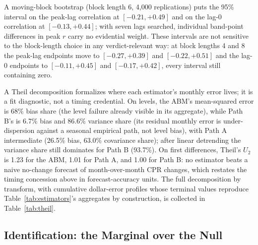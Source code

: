 \documentclass[12pt]{article}
\begin{document}
A moving-block bootstrap (block length 6, 4,000 replications) puts the 95\% interval on the peak-lag correlation at $[-0.21, +0.49]$ and on the lag-0 correlation at $[-0.13, +0.44]$; with seven lags searched, individual band-point differences in peak $r$ carry no evidential weight. These intervals are not sensitive to the block-length choice in any verdict-relevant way: at block lengths 4 and 8 the peak-lag endpoints move to $[-0.27, +0.39]$ and $[-0.22, +0.51]$ and the lag-0 endpoints to $[-0.11, +0.45]$ and $[-0.17, +0.42]$, every interval still containing zero.

A Theil decomposition formalizes where each estimator's monthly error lives; it is a fit diagnostic, not a timing credential. On levels, the ABM's mean-squared error is 68\% bias share (the level failure already visible in its aggregate), while Path B's is 6.7\% bias and 86.6\% variance share (its residual monthly error is under-dispersion against a seasonal empirical path, not level bias), with Path A intermediate (26.5\% bias, 63.0\% covariance share); after linear detrending the variance share still dominates for Path B (93.7\%). On first differences, Theil's $U_2$ is 1.23 for the ABM, 1.01 for Path A, and 1.00 for Path B: no estimator beats a naive no-change forecast of month-over-month CPR changes, which restates the timing concession above in forecast-accuracy units. The full decomposition by transform, with cumulative dollar-error profiles whose terminal values reproduce Table~\ref{tab:estimators}'s aggregates by construction, is collected in Table~\ref{tab:theil}.

\subsection{Identification: the Marginal over the Null}\label{sec:identification}
\end{document}
